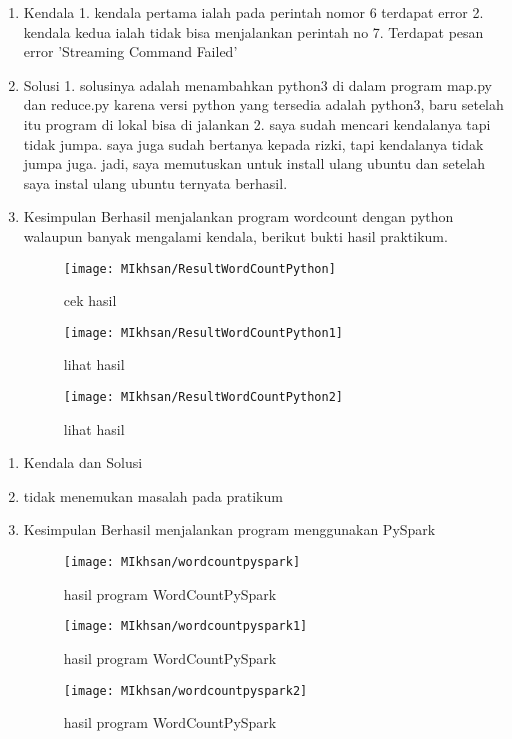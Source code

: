 \begin{enumerate}
\item Kendala  
1. kendala pertama ialah pada perintah nomor 6 terdapat error
2. kendala kedua ialah tidak bisa menjalankan perintah no 7. Terdapat pesan error 'Streaming Command Failed'

\item Solusi
1. solusinya adalah menambahkan python3 di dalam program map.py dan reduce.py karena versi python yang tersedia adalah python3, baru setelah itu program di lokal bisa di jalankan
2. saya sudah mencari kendalanya tapi tidak jumpa. saya juga sudah bertanya kepada rizki, tapi kendalanya tidak jumpa juga. jadi, saya memutuskan untuk install ulang ubuntu dan setelah saya instal ulang ubuntu ternyata berhasil.

\item Kesimpulan
Berhasil menjalankan program wordcount dengan python walaupun banyak mengalami kendala, berikut bukti hasil praktikum. 

\begin{figure}[!ht]
    \texttt{[image: MIkhsan/ResultWordCountPython]}
    \caption{cek hasil }
    \label{gam:hasil}
    \end{figure}
\begin{figure}[!ht]
    \texttt{[image: MIkhsan/ResultWordCountPython1]}
    \caption{lihat hasil}
    \label{gam:hasil}
    \end{figure}
\begin{figure}[!ht]
    \texttt{[image: MIkhsan/ResultWordCountPython2]}
    \caption{lihat hasil}
    \label{gam:hasil}
    \end{figure}
\end{enumerate}

\begin{enumerate}
\item Kendala dan Solusi
\item tidak menemukan masalah pada pratikum

\item Kesimpulan
Berhasil menjalankan program menggunakan PySpark

\begin{figure}[!ht]
    \texttt{[image: MIkhsan/wordcountpyspark]}
    \caption{hasil program WordCountPySpark }
    \label{gam:hasil instalasi spark}
    \end{figure}
\begin{figure}[!ht]
    \texttt{[image: MIkhsan/wordcountpyspark1]}
    \caption{hasil program WordCountPySpark }
    \label{gam:hasil instalasi spark}
    \end{figure}
\begin{figure}[!ht]
    \texttt{[image: MIkhsan/wordcountpyspark2]}
    \caption{hasil program WordCountPySpark }
    \label{gam:hasil instalasi spark}
    \end{figure}
\end{enumerate}